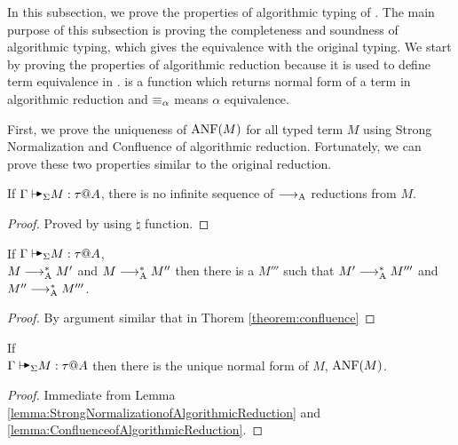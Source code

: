 In this subsection, we prove the properties of algorithmic typing of \LMD. The
main purpose of this subsection is proving the completeness and soundness of
algorithmic typing, which gives the equivalence with the original typing. We
start by proving the properties of algorithmic reduction because it is used to
define term equivalence in \QAANF. \ANF is a function which returns normal form
of a term in algorithmic reduction and \( \equiv_\alpha \) means \( \alpha \)
equivalence.

\begin{center}
\end{center}

First, we prove the uniqueness of \( \text{ANF}(M) \) for all typed term \( M \)
using Strong Normalization and Confluence of algorithmic reduction.
Fortunately, we can prove these two properties similar to the original
reduction.

\begin{lemma}
    \label{lemma:StrongNormalizationofAlgorithmicReduction}
    If \( \G \AVS M :\tau @ A\), there is no infinite sequence of \( \longrightarrow_{\text{A}} \) reductions from \( M \).
\end{lemma}

\begin{proof}
    Proved by using \( \natural \) function.
\end{proof}

\begin{lemma}
    \label{lemma:ConfluenceofAlgorithmicReduction}
    If \({ \G \AVS M :\tau @ A }\), \\ \({ M \longrightarrow_{\text{A}}^* M' }\) and \({ M \longrightarrow_{\text{A}}^* M'' }\)
    then there is a \( M''' \) such that \({ M' \longrightarrow_{\text{A}}^* M''' }\) and \({ M'' \longrightarrow_{\text{A}}^* M''' }\).
\end{lemma}

\begin{proof}
    By argument similar that in Thorem \ref{theorem:confluence} 
\end{proof}

\begin{lemma}
    \label{lemma:UniquenessOfANF}
    If \\ \({ \G \AVS M : \tau @ A }\) then there is the unique normal form of \( M \), \( \text{ANF}(M) \).
\end{lemma}

\begin{proof}
    Immediate from Lemma \ref{lemma:StrongNormalizationofAlgorithmicReduction} and \ref{lemma:ConfluenceofAlgorithmicReduction}.
\end{proof}

